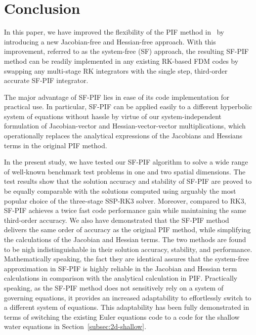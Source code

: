 \documentclass[times,preprint,3p]{elsarticle}
\begin{document}
\section{Conclusion}\label{sec:conclusion}

In this paper, we have improved the flexibility of the
PIF method in~\cite{christlieb2015picard}
by introducing a new Jacobian-free and Hessian-free approach.
With this improvement, referred to as the system-free (SF) approach,
the resulting SF-PIF method
can be readily implemented in any existing RK-based FDM codes
by swapping any multi-stage RK integrators
with the single step, third-order accurate SF-PIF integrator.

%
The major advantage of SF-PIF lies in ease of its code implementation
for practical use.  In particular, SF-PIF can be applied easily
to a different hyperbolic system of equations without hassle
by virtue of our system-independent formulation of
Jacobian-vector and Hessian-vector-vector multiplications,
which operationally replaces the analytical expressions
of the Jacobians and Hessians terms
in the original PIF method.

In the present study, we have tested our SF-PIF algorithm
to solve a wide range of well-known benchmark test problems in
one and two spatial dimensions. The test results show that
the solution accuracy and stability of SF-PIF are proved to be
equally comparable with the solutions computed using arguably the
most popular choice of the three-stage SSP-RK3 solver.
Moreover, compared to RK3, SF-PIF achieves a twice fast
code performance gain while maintaining the same third-order accuracy.
%
%
%
We also have demonstrated that the SF-PIF method
delivers the same order of accuracy as the original PIF method,
while simplifying the calculations of the Jacobian and Hessian terms.
The two methods are found to be nigh indistinguishable in their solution
accuracy, stability, and performance.
%
Mathematically speaking, the fact they are identical
assures that the system-free approximation in SF-PIF is
highly reliable in the Jacobian and Hessian term calculations
in comparison with the analytical calculation in PIF\@.
%
%
Practically speaking, as the SF-PIF
method does not sensitively rely on a system of governing equations,
it provides an increased adaptability
to effortlessly switch to a different system of equations.
This adaptability has been fully demonstrated
in terms of switching the existing Euler equations code
to a code for the shallow water equations
in Section~\ref{subsec:2d-shallow}.
\end{document}
